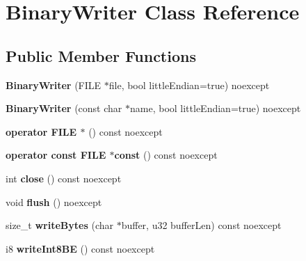 \hypertarget{class_binary_writer}{}\section{Binary\+Writer Class Reference}
\label{class_binary_writer}
\subsection*{Public Member Functions}
\begin{DoxyCompactItemize}
\item 
\mbox{\label{class_binary_writer_abcb90dca785e2d864c859b21fa9e77b6}} 
{\bfseries Binary\+Writer} (F\+I\+LE $\ast$file, bool little\+Endian=true) noexcept
\item 
\mbox{\label{class_binary_writer_ab9132240f42d610c5f827c23fbf6ffa3}} 
{\bfseries Binary\+Writer} (const char $\ast$name, bool little\+Endian=true) noexcept
\item 
\mbox{\label{class_binary_writer_a0c9b41b521fc069aca88f51ddafc7f77}} 
{\bfseries operator F\+I\+L\+E $\ast$} () const noexcept
\item 
\mbox{\label{class_binary_writer_a1f677e31b48add5bd8118ceeb032343b}} 
{\bfseries operator const F\+I\+L\+E $\ast$const} () const noexcept
\item 
\mbox{\label{class_binary_writer_afc8d5bf552fbbe39f52a413b872fe10a}} 
int {\bfseries close} () const noexcept
\item 
\mbox{\label{class_binary_writer_a0ee6e0944c26a1fd8da7d450893ce3fc}} 
void {\bfseries flush} () noexcept
\item 
\mbox{\label{class_binary_writer_a20eb6655ddebb9497ade94c07319e853}} 
size\+\_\+t {\bfseries write\+Bytes} (char $\ast$buffer, u32 buffer\+Len) const noexcept
\item 
\mbox{\label{class_binary_writer_a967ce3b217cb60dde3f5b243e2e79e44}} 
i8 {\bfseries write\+Int8\+BE} () const noexcept
\item 
\mbox{\label{class_binary_writer_a4b96c45430a03244b66f766f3113a2a9}} 

\end{DoxyCompactItemize}
